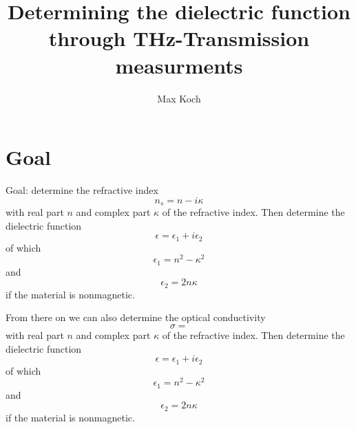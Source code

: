 \documentclass[aspectratio=1610, 9pt]{beamer}
\title{Determining the dielectric function through THz-Transmission measurments}
\author[M.~Koch]{Max Koch}
\institute[AG Wang]{Arbeitsgruppe Wang \\  Fakultät Physik}
\begin{document}
\maketitle

\section{Goal}
\begin{frame}
Goal: determine the refractive index 
\begin{equation}
  n_s = n - i\kappa
\end{equation}
with real part $n$ and complex part $\kappa$ of the refractive index.
Then determine the dielectric function 
\begin{equation}
  \epsilon = \epsilon_1 + i\epsilon_2
\end{equation}
of which
\begin{equation}
  \epsilon_1 = n^2 - \kappa^2
\end{equation}
and 
\begin{equation}
  \epsilon_2  = 2n\kappa 
\end{equation}
if the material is nonmagnetic.
\end{frame}

\begin{frame}
  From there on we can also determine the optical conductivity 
  \begin{equation}
    \sigma = 
  \end{equation}
  with real part $n$ and complex part $\kappa$ of the refractive index.
  Then determine the dielectric function 
  \begin{equation}
    \epsilon = \epsilon_1 + i\epsilon_2
  \end{equation}
  of which
  \begin{equation}
    \epsilon_1 = n^2 - \kappa^2
  \end{equation}
  and 
  \begin{equation}
    \epsilon_2  = 2n\kappa 
  \end{equation}
  if the material is nonmagnetic.
  \end{frame}
\end{document}
